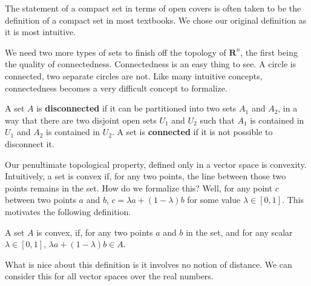 The statement of a compact set in terms of open covers is often taken to be the definition of a compact set in most textbooks. We chose our original definition as it is most intuitive.

We need two more types of sets to finish off the topology of $\mathbf{R}^n$, the first being the quality of connectedness. Connectedness is an easy thing to see. A circle is connected, two separate circles are not. Like many intuitive concepts, connectedness becomes a very difficult concept to formalize.

\begin{definition}
  A set $A$ is {\bf disconnected} if it can be partitioned into two sets $A_1$ and $A_2$, in a way that there are two disjoint open sets $U_1$ and $U_2$ such that $A_1$ is contained in $U_1$ and $A_2$ is contained in $U_2$. A set is {\bf connected} if it is not possible to disconnect it.
\end{definition}

Our penultimate topological property, defined only in a vector space is convexity. Intuitively, a set is convex if, for any two points, the line between those two points remains in the set. How do we formalize this? Well, for any point $c$ between two points $a$ and $b$, $c = \lambda a + (1 - \lambda)b$ for some value $\lambda \in [0,1]$. This motivates the following definition.

\begin{definition}
  A set $A$ is convex, if, for any two points $a$ and $b$ in the set, and for any scalar $\lambda \in [0,1]$, $\lambda a + (1 - \lambda) b \in A$.
\end{definition}

What is nice about this definition is it involves no notion of distance. We can consider this for all vector spaces over the real numbers.


